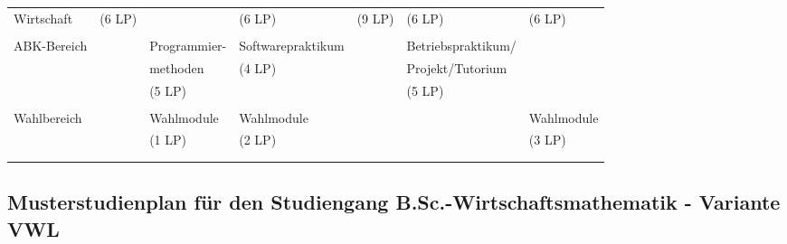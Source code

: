 \begin{center}
\begin{tabular}{||l||l|l|l|l|l|l||}
\hhline{||~||~|~|~|~|~|~||} Wirtschaft&(6 LP)&&(6 LP)&(9 LP)&(6 LP)&(6 LP)\\
\hhline{||~||~|~|~|~|~|~||} &&&&&&\\
\hhline{|:=::======:|} ABK-Bereich&&Programmier-&Softwarepraktikum&&Betriebspraktikum/& \\
\hhline{||~||~|~|~|~|~|~||} &&methoden&(4 LP)&&Projekt/Tutorium&\\
\hhline{||~||~|~|~|~|~|~||} &&(5 LP)&&&(5 LP)&\\
\hhline{||~||~|~|~|~|~|~||} &&&&&&\\
\hhline{|:=::======:|} Wahlbereich&&Wahlmodule&Wahlmodule&&&Wahlmodule\\
\hhline{||~||~|~|~|~|~|~||} &&(1 LP)&(2 LP)&&&(3 LP)\\
\hhline{||~||~|~|~|~|~|~||} &&&&&&\\
\hhline{|b:=:b:======:b|}
\end{tabular}
\end{center}

\clearpage

\subsection{Musterstudienplan für den Studiengang B.Sc.-Wirtschaftsmathematik -
Variante VWL}

